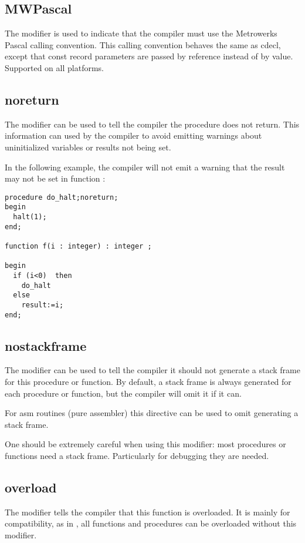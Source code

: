 \subsection{MWPascal}
The  modifier is used to indicate that the compiler must
use the Metrowerks Pascal calling convention. This calling convention behaves the same as
cdecl, except that const record parameters are passed by reference
instead of by value. Supported on all platforms.



\subsection{noreturn}
\label{se:noreturn}
The  modifier can be used to tell the compiler the procedure
does not return. This information can used by the compiler to avoid emitting
warnings about uninitialized variables or results not being set.

In the following example, the compiler will not emit a warning that the
result may not be set in function :
\begin{verbatim}
procedure do_halt;noreturn;
begin
  halt(1);
end;

function f(i : integer) : integer ;

begin
  if (i<0)  then
    do_halt
  else
    result:=i;
end;
\end{verbatim}

\subsection{nostackframe}
\label{se:nostackframe}
The  modifier can be used to tell the compiler it should
not generate a stack frame for this procedure or function. By default, a
stack frame is always generated for each procedure or function, but the compiler
will omit it if it can.

For asm routines (pure assembler) this directive can be used to omit generating a
stack frame.

One should be extremely careful when using this modifier: most procedures or
functions need a stack frame. Particularly for debugging they are needed.

\subsection{overload}
\label{se:overload}
The  modifier tells the compiler that this function is
overloaded. It is mainly for \delphi compatibility, as in \fpc, all
functions and procedures can be overloaded without this modifier.

